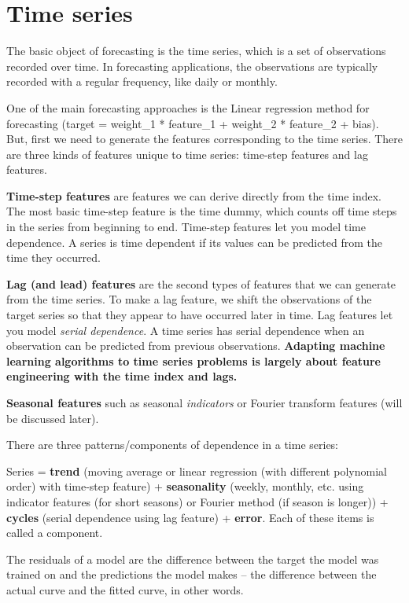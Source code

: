 \documentclass[12pt]{report}
\begin{document}
\section{Time series}
The basic object of forecasting is the time series, which is a set of observations recorded over time. In forecasting applications, the observations are typically recorded with a regular frequency, like daily or monthly.

One of the main forecasting approaches is the Linear regression method for forecasting (target = weight\_1 * feature\_1 + weight\_2 * feature\_2 + bias). But, first we need to generate the features corresponding to the time series. There are three kinds of features unique to time series: time-step features and lag features.

\textbf{Time-step features} are features we can derive directly from the time index. The most basic time-step feature is the time dummy, which counts off time steps in the series from beginning to end. Time-step features let you model time dependence. A series is time dependent if its values can be predicted from the time they occurred.

\textbf{Lag (and lead) features} are the second types of features that we can generate from the time series. To make a lag feature, we shift the observations of the target series so that they appear to have occurred later in time. Lag features let you model \textit{serial dependence}. A time series has serial dependence when an observation can be predicted from previous observations. \textbf{Adapting machine learning algorithms to time series problems is largely about feature engineering with the time index and lags.}


\textbf{Seasonal features} such as seasonal \textit{indicators} or Fourier transform features (will be discussed later).

There are three patterns/components of dependence in a time series:

Series = \textbf{trend }(moving average or linear regression (with different polynomial order) with time-step feature) + \textbf{seasonality} (weekly, monthly, etc. using indicator features (for short seasons) or Fourier method (if season is longer)) + \textbf{cycles} (serial dependence using lag feature) + \textbf{error}. Each of these items is called a component.

The residuals of a model are the difference between the target the model was trained on and the predictions the model makes -- the difference between the actual curve and the fitted curve, in other words.
\end{document}

